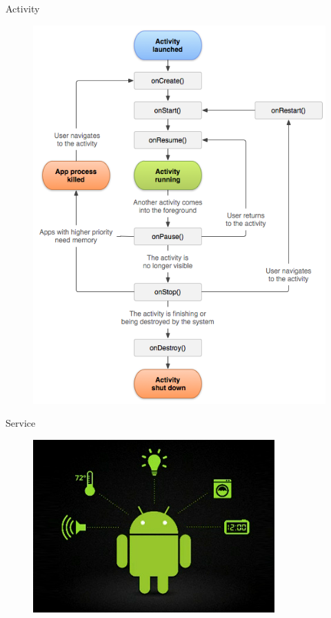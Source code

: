 \documentclass{beamer}
\begin{document}
\begin{frame}{Activity}
\begin{figure}[hb]
 \centering
 \includegraphics[scale=0.3]{activity-lifecycle}
\end{figure}
\end{frame}

\begin{frame}{Service}
\begin{figure}[hb]
 \centering
 \includegraphics[scale=0.7]{android-service}
\end{figure}
\end{frame}
\end{document}
